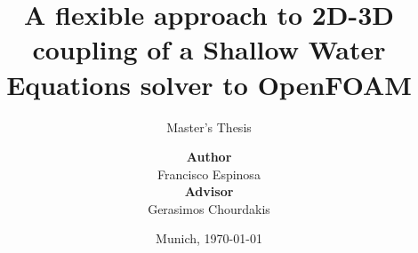 %
% 
% 
%
\newcommand{\shiftedframetitle}[1]{\frametitle{\\\vspace{-2cm}#1}\vspace{0.5cm}}





\renewcommand{\PersonTitel}{}
\newcommand{\Datum}{\today}

\renewcommand{\PraesentationFusszeileZusatz}{| Master's Thesis}

\title{A flexible approach to 2D-3D coupling of a Shallow Water Equations solver to OpenFOAM}
\subtitle{Master's Thesis}
\author{\vspace{0.5cm}\textbf{Author}\\Francisco Espinosa \\[0.2cm] \textbf{Advisor} \\Gerasimos Chourdakis}
\date[\Datum]{Munich, \Datum}
\subject{Master's Thesis}





